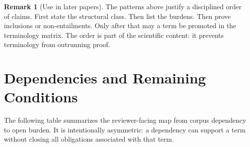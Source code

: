 \documentclass[11pt,a4paper]{article}
\theoremstyle{definition}
\newtheorem{remark}[theorem]{Remark}
\begin{document}
\begin{remark}[Use in later papers]
The patterns above justify a disciplined order of claims. First state the
structural class. Then list the burdens. Then prove inclusions or
non-entailments. Only after that may a term be promoted in the terminology
matrix. The order is part of the scientific content: it prevents terminology
from outrunning proof.
\end{remark}

\section{Dependencies and Remaining Conditions}

The following table summarizes the reviewer-facing map from corpus dependency to open
burden. It is intentionally asymmetric: a dependency can support a term without
closing all obligations associated with that term.
\end{document}
